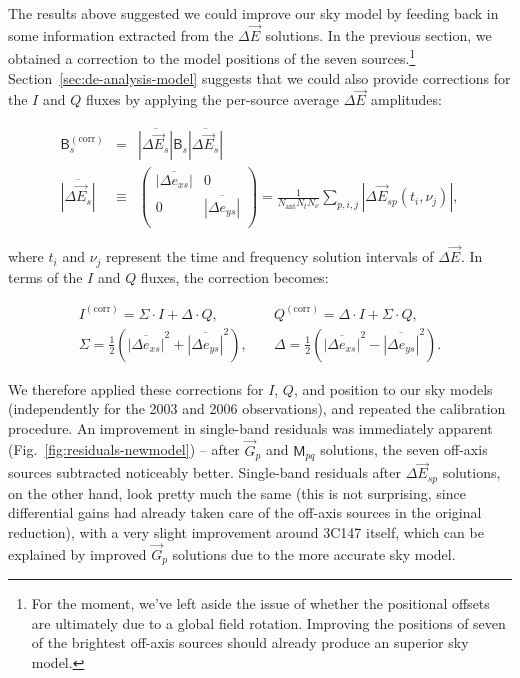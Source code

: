 \documentclass[]{aa}
\newcommand{\matrixtt}[4]{\left( \begin{array}{cc}#1&#2\\#3&#4\\\end{array} \right)}
\newcommand{\jones}[2]{\vec {#1}_{#2}}
\newcommand{\coh}[2]{\mathsf{{#1}}_{{#2}}}
\begin{document}
The results above suggested we could improve our sky model by feeding back in some information extracted from the $\Delta\jones{E}{}$ solutions. In the previous section, we obtained a correction to the model positions of  the seven sources.\footnote{For the moment, we've left aside the issue of whether the positional offsets are ultimately due to a global field rotation. Improving the positions of seven of the brightest off-axis sources should already produce an superior sky model.} Section~\ref{sec:de-analysis-model} suggests that we could also provide corrections for the $I$ and $Q$ fluxes by applying the per-source average $\Delta\jones{E}{}$ amplitudes:

\begin{eqnarray*}
\coh{B}{s}^\mathrm{(corr)} & = & \overline{|\Delta\jones{E}{s}|} \coh{B}{s} \overline{|\Delta\jones{E}{s}|} \\
\overline{|\Delta\jones{E}{s}|} & \equiv & \matrixtt{\overline{|\Delta e_{xs}|}}{0}{0}{\overline{|\Delta e_{ys}|}} = \frac{1}{N_\mathrm{ant}N_t N_\nu} \sum_{p,i,j} |\Delta\jones{E}{sp}(t_i,\nu_j)|,
\end{eqnarray*}

where $t_i$ and $\nu_j$ represent the time and frequency solution intervals of $\Delta\jones{E}{}$. In terms of the $I$ and $Q$ fluxes, the correction becomes:

\begin{eqnarray*}
I^\mathrm{(corr)} = \Sigma \cdot I + \Delta \cdot Q, & \; &  Q^\mathrm{(corr)} = \Delta \cdot I + \Sigma \cdot Q, \\
\Sigma = \frac{1}{2}\left( \overline{|\Delta e_{xs}|}^2 + \overline{|\Delta e_{ys}|}^2 \right), 
& \; & \Delta = \frac{1}{2}\left( \overline{|\Delta e_{xs}|}^2 - \overline{|\Delta e_{ys}|}^2 \right).
\end{eqnarray*}

We therefore applied these corrections for $I$, $Q$, and position to our sky models (independently for the 2003 and 2006 observations), and repeated the calibration procedure. An improvement in single-band residuals was immediately apparent (Fig.~\ref{fig:residuals-newmodel}) -- after $\jones{G}{p}$ and $\coh{M}{pq}$ solutions, the seven off-axis sources subtracted noticeably better. Single-band residuals after $\Delta\jones{E}{sp}$ solutions, on the other hand, look pretty much the same (this is not surprising, since differential gains had already taken care of the off-axis sources in the original reduction), with a very slight improvement around 3C147 itself, which can be explained by improved $\jones{G}{p}$ solutions due to the more accurate sky model.
\end{document}
